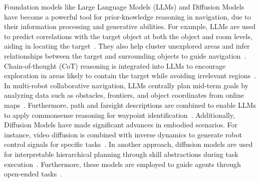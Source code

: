 Foundation models like Large Language Models (LLMs) and Diffusion Models have become a powerful tool for prior-knowledge reasoning in navigation, due to their information processing and generative abilities. For example, LLMs are used to predict correlations with the target object at both the object and room levels, aiding in locating the target~\cite{zhou2023esc, gadre2023cows}. They also help cluster unexplored areas and infer relationships between the target and surrounding objects to guide navigation~\cite{yu2023l3mvn, cai2024bridging}. Chain-of-thought (CoT) reasoning is integrated into LLMs to encourage exploration in areas likely to contain the target while avoiding irrelevant regions~\cite{shah2023navigation}. In multi-robot collaborative navigation, LLMs centrally plan mid-term goals by analyzing data such as obstacles, frontiers, and object coordinates from online maps~\cite{yu2023co}. Furthermore, path and farsight descriptions are combined to enable LLMs to apply commonsense reasoning for waypoint identification~\cite{wu2024voronav}.
%
Additionally, Diffusion Models have made significant advances in embodied scenarios. For instance, video diffusion is combined with inverse dynamics to generate robot control signals for specific tasks~\cite{du2024learning, ajay2024compositional}. In another approach, diffusion models are used for interpretable hierarchical planning through skill abstractions during task execution~\cite{liang2024skilldiffuser}. Furthermore, these models are employed to guide agents through open-ended tasks~\cite{qin2023mp5, zhou2024minedreamer}.
